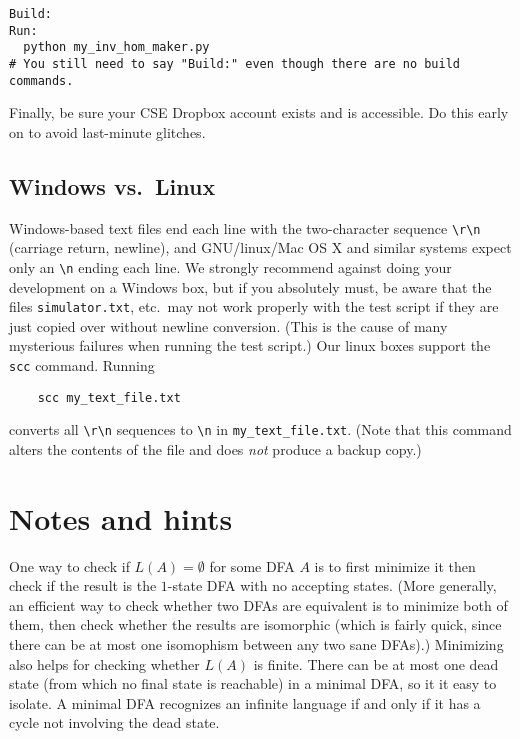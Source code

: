 \documentclass[11pt]{article}
\begin{document}
\begin{verbatim}
Build:
Run:
  python my_inv_hom_maker.py
# You still need to say "Build:" even though there are no build commands.
\end{verbatim}

Finally, be sure your CSE Dropbox account exists and is accessible.
Do this early on to avoid last-minute glitches.

\subsection{Windows vs.\ Linux}

Windows-based text files end each line with the two-character sequence
\verb+\r\n+ (carriage return, newline), and GNU/linux/Mac OS X and
similar systems expect only an \verb+\n+ ending each line.  We
strongly recommend against doing your development on a Windows box,
but if you absolutely must, be aware that the files
\texttt{simulator.txt}, etc.\ may not work properly with the test
script if they are just copied over without newline conversion.  (This
is the cause of many mysterious failures when running the test
script.)  Our linux boxes support the \texttt{scc} command.  Running

\begin{verbatim}
    scc my_text_file.txt
\end{verbatim}

converts all \verb+\r\n+ sequences to \verb+\n+ in
\texttt{my\_text\_file.txt}.  (Note that this command alters the
contents of the file and does \emph{not} produce a backup copy.)


\section{Notes and hints}

One way to check if $L(A)=\emptyset$ for some DFA $A$ is to first
minimize it then check if the result is the $1$-state DFA with no
accepting states.  (More generally, an efficient way to check whether
two DFAs are equivalent is to minimize both of them, then check
whether the results are isomorphic (which is fairly quick, since there
can be at most one isomophism between any two sane DFAs).)  Minimizing
also helps for checking whether $L(A)$ is finite.  There can be at
most one dead state (from which no final state is reachable) in a
minimal DFA, so it it easy to isolate.  A minimal DFA recognizes an
infinite language if and only if it has a cycle not involving the dead
state.
\end{document}
